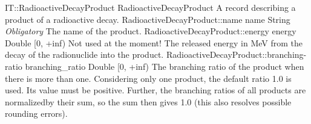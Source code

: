 \begin{RecordType}
	{IT::RadioactiveDecayProduct}
	{RadioactiveDecayProduct}
	{}%
	{}%
	{{{A record describing a product of a radioactive decay.}%
}}
		\RecKey
			{RadioactiveDecayProduct::name}
			{name}
			{{String}}{}
			{ \it{Obligatory}}
			{{{The name of the product.}%
}}
		\RecKey
			{RadioactiveDecayProduct::energy}
			{energy}
			{{Double [0, +inf)}}{}
			{ }
			{{{Not used at the moment! The released energy in MeV from the decay of the radionuclide into the product.}%
}}
		\RecKey
			{RadioactiveDecayProduct::branching-ratio}
			{branching{\_}ratio}
			{{Double [0, +inf)}}{}
			{ }
			{{{The branching ratio of the product when there is more than one.
Considering only one product, the default ratio 1.0 is used.
Its value must be positive.
Further, the branching ratios of all products are normalizedby their sum, so the sum then gives 1.0 (this also resolves possible rounding errors).}%
}}
\end{RecordType}
